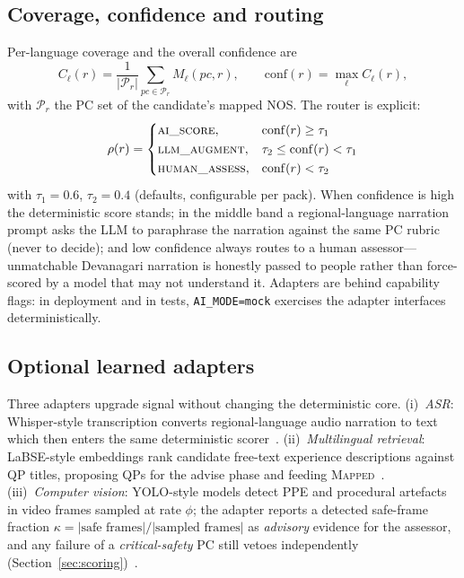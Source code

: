 \documentclass[conference]{IEEEtran}
\begin{document}
\subsection{Coverage, confidence and routing}
Per-language coverage and the overall confidence are
\begin{equation}
C_\ell(r) = \frac{1}{|\mathcal{P}_r|}\sum_{pc \in \mathcal{P}_r} M_\ell(pc, r), \qquad
\mathrm{conf}(r) = \max_{\ell} C_\ell(r),
\label{eq:coverage}
\end{equation}
with $\mathcal{P}_r$ the PC set of the candidate's mapped NOS. The router is explicit:
\begin{equation}
\rho(r) = \begin{cases}
\textsc{ai\_score},        & \mathrm{conf}(r) \ge \tau_1 \\[1pt]
\textsc{llm\_augment},     & \tau_2 \le \mathrm{conf}(r) < \tau_1 \\[1pt]
\textsc{human\_assess},    & \mathrm{conf}(r) < \tau_2
\end{cases}
\label{eq:router}
\end{equation}
with $\tau_1=0.6$, $\tau_2=0.4$ (defaults, configurable per pack). When confidence is high
the deterministic score stands; in the middle band a regional-language narration prompt
asks the LLM to paraphrase the narration against the same PC rubric (never to decide); and
low confidence always routes to a human assessor---unmatchable Devanagari narration is
honestly passed to people rather than force-scored by a model that may not understand it.
Adapters are behind capability flags: in deployment and in tests, \texttt{AI\_MODE=mock}
exercises the adapter interfaces deterministically.

\subsection{Optional learned adapters}
Three adapters upgrade signal without changing the deterministic core. (i)~\emph{ASR}:
Whisper-style transcription converts regional-language audio narration to text which then
enters the same deterministic scorer~\cite{whisper}. (ii)~\emph{Multilingual retrieval}:
LaBSE-style embeddings rank candidate free-text experience descriptions against QP titles,
proposing QPs for the advise phase and feeding \textsc{Mapped}~\cite{labse}.
(iii)~\emph{Computer vision}: YOLO-style models detect PPE and procedural artefacts in video
frames sampled at rate $\phi$; the adapter reports a detected safe-frame fraction
$\kappa = |\text{safe frames}|/|\text{sampled frames}|$ as \emph{advisory} evidence for the
assessor, and any failure of a \emph{critical-safety} PC still vetoes
independently (Section~\ref{sec:scoring})~\cite{yolo}.
\end{document}
